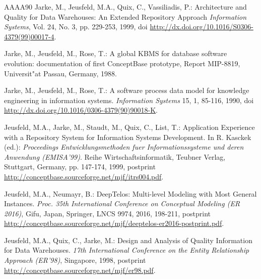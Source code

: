 \begin{thebibliography}{AAAA90}
 Jarke, M., Jeusfeld, M.A., Quix, C., Vassiliadis, P.:
Architecture and Quality for Data Warehouses: An Extended Repository Approach
{\em Information Systems}, Vol. 24, No. 3, pp. 229-253, 1999,
doi \url{http://dx.doi.org/10.1016/S0306-4379(99)00017-4}.

 Jarke, M., Jeusfeld, M., Rose, T.: A global KBMS for database
software evolution: documentation of first ConceptBase prototype,
Report MIP-8819, Universit"at Passau, Germany, 1988.

 Jarke, M., Jeusfeld, M., Rose, T.: A software process
data model for knowledge engineering in information systems.
{\it Information Systems\/} 15, 1, 85-116, 1990,
doi \url{http://dx.doi.org/10.1016/0306-4379(90)90018-K}.

Jeusfeld, M.A., Jarke, M., Staudt, M., Quix, C., List, T.:
Application Experience with a Repository System for Information Systems Development.
In R. Kasckek (ed.): {\em Proceedings Entwicklungsmethoden fuer Informationssysteme und deren Anwendung (EMISA'99)}.
Reihe Wirtschaftsinformatik, Teubner Verlag, Stuttgart, Germany, pp. 147-174, 1999,
postprint \url{http://conceptbase.sourceforge.net/mjf/itrs004.pdf}.




  Jeusfeld, M.A., Neumayr, B.:
DeepTelos: Multi-level Modeling with Most General Instances.
{\em Proc. 35th International Conference on Conceptual Modeling (ER 2016)}, Gifu, Japan,
Springer, LNCS 9974, 2016, 198-211,
postprint \url{http://conceptbase.sourceforge.net/mjf/deeptelos-er2016-postprint.pdf}.

 Jeusfeld, M.A., Quix, C., Jarke, M.:
Design and Analysis of Quality Information for Data Warehouses.
{\em 17th International Conference on the Entity Relationship Approach (ER'98)}, Singapore, 1998,
postprint \url{http://conceptbase.sourceforge.net/mjf/er98.pdf}.


\end{thebibliography}
